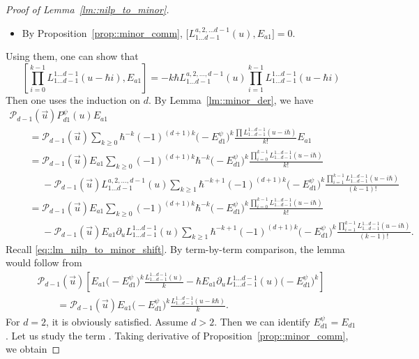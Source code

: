 \documentclass[10pt,a4paper]{article}
\numberwithin{equation}{section}
\newcommand{\calP}{\mathcal{P}}
\begin{document}
\begin{proof}[Proof of Lemma~\ref{lm::nilp_to_minor}]
\begin{itemize}
			\item By Proposition~\ref{prop::minor_comm},
$\bigl[L^{a,2,\dots d-1}_{1 \dots d-1}(u),E_{a1}\bigr] = 0$.
		\end{itemize}
		Using them, one can show that
		\[
		\left[\prod\limits_{i=0}^{k-1} L_{1\dots d-1}^{1\dots d-1}(u - \hbar i),E_{a1}\right] = -k\hbar L_{1\dots d-1}^{a,2,\dots,d-1}(u) \prod\limits_{i=1}^{k-1} L_{1\dots d-1}^{1\dots d-1}(u-\hbar i)
		\]
		Then one uses the induction on $d$. By Lemma~\ref{lm::minor_der}, we have
		\begin{gather*}
			 \calP_{d-1}(\vec{u})P_{d1}^{\psi}(u) E_{a1} \\
			\qquad= \calP_{d-1}(\vec{u})\sum\limits_{k\geq 0} \hbar^{-k} (-1)^{(d+1)k} \bigl(-E_{d1}^{\psi}\bigr)^k \frac{\prod L_{1\dots d-1}^{1\dots d-1}(u-i\hbar)}{k!} E_{a1} \\
			\qquad= \calP_{d-1}(\vec{u})E_{a1} \sum\limits_{k\geq 0} (-1)^{(d+1)k} \hbar^{-k} \bigl(-E_{d1}^{\psi}\bigr)^k \frac{\prod_{i=0}^{k-1} L_{1\dots d-1}^{1\dots d-1}(u-i\hbar)}{k!} \\
			\phantom{\qquad=}- \calP_{d-1}(\vec{u}) L_{1\dots d-1}^{a,2,\dots,d-1}(u) \sum\limits_{k\geq 1} \hbar^{-k+1} (-1)^{(d+1)k} \bigl(-E_{d1}^{\psi}\bigr)^k \frac{\prod_{i=1}^{k-1} L_{1\dots d-1}^{1\dots d-1}(u-i\hbar)}{(k-1)!} \\
			\qquad= \calP_{d-1}(\vec{u})E_{a1} \sum\limits_{k\geq 0} (-1)^{(d+1)k} \hbar^{-k} \bigl(-E_{d1}^{\psi}\bigr)^k \frac{\prod_{i=0}^{k-1} L_{1\dots d-1}^{1\dots d-1}(u-i\hbar)}{k!} \\
		\phantom{\qquad=}	- \calP_{d-1}(\vec{u}) E_{a1} \partial_u L_{1\dots d-1}^{1\dots d-1}(u) \sum\limits_{k\geq 1} \hbar^{-k+1} (-1)^{(d+1)k} \bigl(-E_{d1}^{\psi}\bigr)^k \frac{\prod_{i=1}^{k-1} L_{1\dots d-1}^{1\dots d-1}(u-i\hbar)}{(k-1)!}.
		\end{gather*}
		Recall \eqref{eq::lm_nilp_to_minor_shift}. By term-by-term comparison, the lemma would follow from
		\begin{gather}
				\calP_{d-1}(\vec{u})\left[ E_{a1} \bigl(-E_{d1}^{\psi}\bigr)^k \frac{L_{1\dots d-1}^{1\dots d-1}(u)}{k} - \hbar E_{a1} \partial_u L_{1\dots d-1}^{1\dots d-1}(u) \bigl(-E_{d1}^{\psi}\bigr)^k \right] \nonumber \\
				\qquad=\calP_{d-1}(\vec{u}) E_{a1} \bigl(-E_{d1}^{\psi}\bigr)^k \frac{L_{1\dots d-1}^{1\dots d-1}(u-k\hbar)}{k}.		\label{eq::taylor_form}
		\end{gather}
		For $d=2$, it is obviously satisfied. Assume $d>2$. Then we can identify $E_{d1}^{\psi} = E_{d1}$. Let us study the term . Taking derivative of Proposition~\ref{prop::minor_comm}, we obtain

\end{proof}
\end{document}
